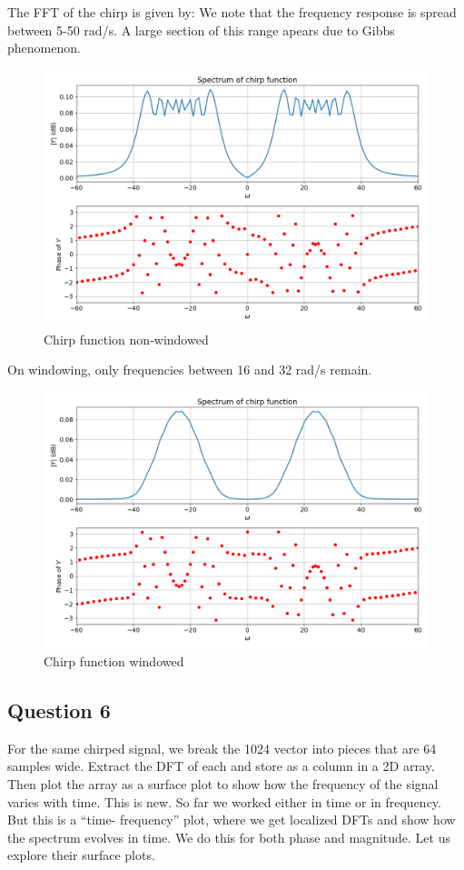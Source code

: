 \documentclass[11pt, a4paper]{article}
\begin{document}
The FFT of the chirp is given by:
We note that the frequency response is spread between 5-50 rad/s. A large section of this range apears due to Gibbs phenomenon. 

\begin{figure}[!tbh]
\centering
\includegraphics[scale=0.4]{plots/chirp_wo.png}
\caption{Chirp function non-windowed}
\label{fig:12}
\end{figure}

On windowing, only frequencies between 16 and 32 rad/s remain.


\begin{figure}[!tbh]
\centering
\includegraphics[scale=0.4]{plots/chirp_with.png}
\caption{Chirp function windowed}
\label{fig:13}
\end{figure}

\newpage
\subsection{Question 6}
For the same chirped signal, we break the 1024 vector into pieces that are 64 samples wide.
Extract the DFT of each and store as a column in a 2D array. Then plot the array as a surface plot to show how the frequency of the signal varies with time.
This is new. So far we worked either in time or in frequency. But this is a “time- frequency” plot, where we get localized DFTs and show how the spectrum evolves in time.
We do this for both phase and magnitude. Let us explore their surface plots. \\
\end{document}
